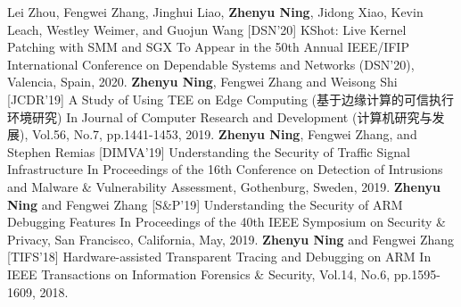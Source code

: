 

\begin{cventries}

 \cventry
     {Lei Zhou, Fengwei Zhang, Jinghui Liao, \textbf{Zhenyu Ning}, Jidong Xiao, Kevin Leach, Westley Weimer, and Guojun Wang} %
    {[DSN'20] KShot: Live Kernel Patching with SMM and SGX} %
    {} %
    {} %
    {To Appear in the 50th Annual IEEE/IFIP International Conference on Dependable Systems and Networks (DSN'20), Valencia, Spain, 2020.
    }
  \vspace{10pt}
  \cventry
    {\textbf{Zhenyu Ning}, Fengwei Zhang and Weisong Shi} %
    {[JCDR'19] A Study of Using TEE on Edge Computing (基于边缘计算的可信执行环境研究)} %
    {} %
    {} %
    {In Journal of Computer Research and Development (计算机研究与发展), Vol.56, No.7, pp.1441-1453, 2019.
    }
    \vspace{10pt}
  \cventry
    {\textbf{Zhenyu Ning}, Fengwei Zhang, and Stephen Remias} %
    {[DIMVA'19] Understanding the Security of Traffic Signal Infrastructure} %
    {} %
    {} %
    {In Proceedings of the 16th Conference on Detection of Intrusions and Malware \& Vulnerability Assessment, Gothenburg, Sweden, 2019.
    }
  \vspace{10pt}
  \cventry
    {\textbf{Zhenyu Ning} and Fengwei Zhang} %
    {[S\&P'19] Understanding the Security of ARM Debugging Features} %
    {} %
    {} %
    {In Proceedings of the 40th IEEE Symposium on Security \& Privacy, San Francisco, California,
May, 2019.
    }
    \vspace{10pt}
  \cventry
    {\textbf{Zhenyu Ning} and Fengwei Zhang} %
    {[TIFS'18] Hardware-assisted Transparent Tracing and Debugging on ARM} %
    {} %
    {} %
    {In IEEE Transactions on Information Forensics \& Security, Vol.14, No.6, pp.1595-1609,
2018.
    }
    \vspace{10pt}

\end{cventries}
